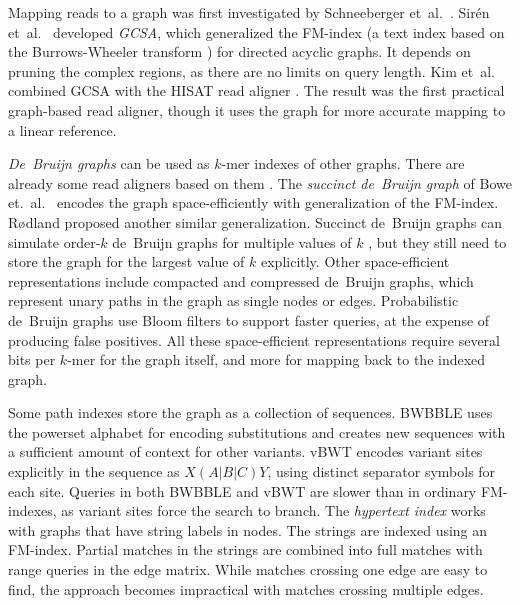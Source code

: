 \documentclass[a4paper,UKenglish]{lipics-v2016}
\newcommand{\kmer}[1]{$#1$\nobreakdash-mer}
\newcommand{\orderk}[1]{order\nobreakdash-$#1$}
\begin{document}
Mapping reads to a graph was first investigated by Schneeberger et~al.~\cite{Schneeberger2009}. Sirén et~al.~\cite{Siren2014} developed \emph{GCSA}, which generalized the FM\nobreakdash-index \cite{Ferragina2005a} (a text index based on the Burrows-Wheeler transform \cite{Burrows1994}) for directed acyclic graphs. It depends on pruning the complex regions, as there are no limits on query length. Kim et~al.~\cite{Kim2015-2016} combined GCSA with the HISAT read aligner \cite{Kim2015}. The result was the first practical graph-based read aligner, though it uses the graph for more accurate mapping to a linear reference.

\emph{De~Bruijn graphs} can be used as \kmer{k} indexes of other graphs. There are already some read aligners based on them \cite{Limasset2015,Liu2016}. The \emph{succinct de~Bruijn graph} of Bowe et.~al.~\cite{Bowe2012} encodes the graph space-efficiently with generalization of the FM\nobreakdash-index. Rødland \cite{Roedland2013} proposed another similar generalization. Succinct de~Bruijn graphs can simulate \orderk{k} de~Bruijn graphs for multiple values of $k$ \cite{Boucher2014}, but they still need to store the graph for the largest value of $k$ explicitly. Other space-efficient representations include compacted \cite{Cazaux2014} and compressed \cite{Marcus2014} de~Bruijn graphs, which represent unary paths in the graph as single nodes or edges. Probabilistic de~Bruijn graphs \cite{Pell2012} use Bloom filters to support faster queries, at the expense of producing false positives. All these space-efficient representations require several bits per \kmer{k} for the graph itself, and more for mapping back to the indexed graph.

Some path indexes store the graph as a collection of sequences. BWBBLE \cite{Huang2013} uses the powerset alphabet for encoding substitutions and creates new sequences with a sufficient amount of context for other variants. vBWT \cite{Maciuca2016} encodes variant sites explicitly in the sequence as $X(A|B|C)Y$, using distinct separator symbols for each site. Queries in both BWBBLE and vBWT are slower than in ordinary FM\nobreakdash-indexes, as variant sites force the search to branch. The \emph{hypertext index} \cite{Thachuk2013} works with graphs that have string labels in nodes. The strings are indexed using an FM-index. Partial matches in the strings are combined into full matches with range queries in the edge matrix. While matches crossing one edge are easy to find, the approach becomes impractical with matches crossing multiple edges.
\end{document}
